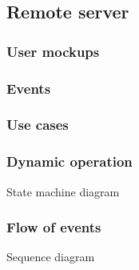 %
\subsection{Remote server}
\label{sec:remote-serv-decomp}

\subsubsection{User mockups}
\label{sec:user-mockups-2}

\subsubsection{Events}
\label{sec:events-2}

\subsubsection{Use cases}
\label{sec:use-cases-2}

\subsubsection{Dynamic operation}
\label{sec:dyn-oper-2}
State machine diagram

\subsubsection{Flow of events}
\label{sec:flow-events-2}
Sequence diagram

